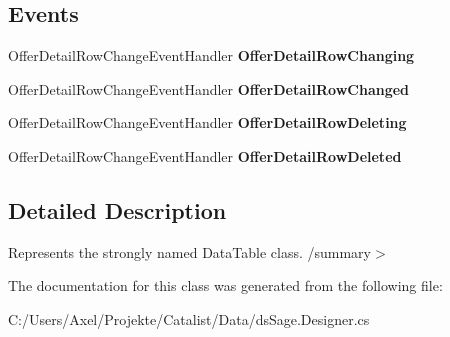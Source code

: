 \subsection*{Events}
\begin{DoxyCompactItemize}
\item 
Offer\+Detail\+Row\+Change\+Event\+Handler {\bfseries Offer\+Detail\+Row\+Changing}\hypertarget{class_products_1_1_data_1_1ds_sage_1_1_offer_detail_data_table_a9d262914b360696a640573175fa09870}{}\label{class_products_1_1_data_1_1ds_sage_1_1_offer_detail_data_table_a9d262914b360696a640573175fa09870}

\item 
Offer\+Detail\+Row\+Change\+Event\+Handler {\bfseries Offer\+Detail\+Row\+Changed}\hypertarget{class_products_1_1_data_1_1ds_sage_1_1_offer_detail_data_table_a132de65e3a87c523c3e0a322e47c9297}{}\label{class_products_1_1_data_1_1ds_sage_1_1_offer_detail_data_table_a132de65e3a87c523c3e0a322e47c9297}

\item 
Offer\+Detail\+Row\+Change\+Event\+Handler {\bfseries Offer\+Detail\+Row\+Deleting}\hypertarget{class_products_1_1_data_1_1ds_sage_1_1_offer_detail_data_table_ac6bbd151a488933a4e442f8d04bc0621}{}\label{class_products_1_1_data_1_1ds_sage_1_1_offer_detail_data_table_ac6bbd151a488933a4e442f8d04bc0621}

\item 
Offer\+Detail\+Row\+Change\+Event\+Handler {\bfseries Offer\+Detail\+Row\+Deleted}\hypertarget{class_products_1_1_data_1_1ds_sage_1_1_offer_detail_data_table_a69963c6a57e3dad0aa3c261158e5d1ed}{}\label{class_products_1_1_data_1_1ds_sage_1_1_offer_detail_data_table_a69963c6a57e3dad0aa3c261158e5d1ed}

\end{DoxyCompactItemize}


\subsection{Detailed Description}
Represents the strongly named Data\+Table class. /summary$>$ 

The documentation for this class was generated from the following file\+:\begin{DoxyCompactItemize}
\item 
C\+:/\+Users/\+Axel/\+Projekte/\+Catalist/\+Data/ds\+Sage.\+Designer.\+cs\end{DoxyCompactItemize}
